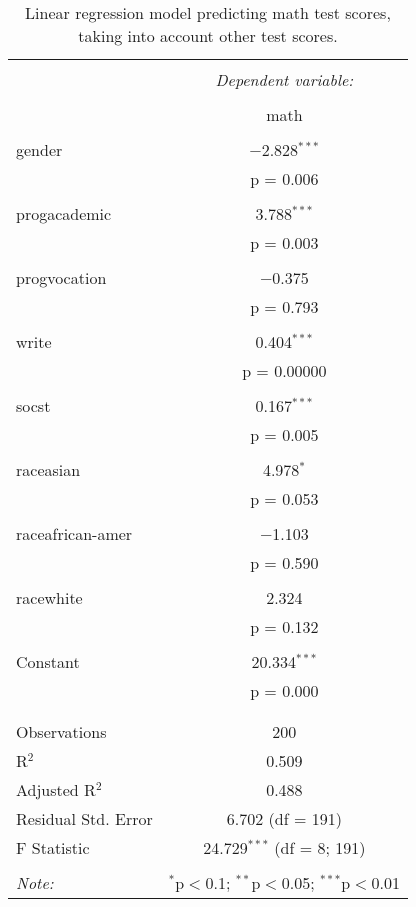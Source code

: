 
\begin{table}[!htbp] \centering 
  \caption{Linear regression model predicting math test scores, taking into 
          account other test scores.} 
  \label{tab::lm_math_peeking} 
\begin{tabular}{@{\extracolsep{5pt}}lc} 
\\[-1.8ex]\hline 
\hline \\[-1.8ex] 
 & \multicolumn{1}{c}{\textit{Dependent variable:}} \\ 
\cline{2-2} 
\\[-1.8ex] & math \\ 
\hline \\[-1.8ex] 
 gender & $-$2.828$^{***}$ \\ 
  & p = 0.006 \\ 
  & \\ 
 progacademic & 3.788$^{***}$ \\ 
  & p = 0.003 \\ 
  & \\ 
 progvocation & $-$0.375 \\ 
  & p = 0.793 \\ 
  & \\ 
 write & 0.404$^{***}$ \\ 
  & p = 0.00000 \\ 
  & \\ 
 socst & 0.167$^{***}$ \\ 
  & p = 0.005 \\ 
  & \\ 
 raceasian & 4.978$^{*}$ \\ 
  & p = 0.053 \\ 
  & \\ 
 raceafrican-amer & $-$1.103 \\ 
  & p = 0.590 \\ 
  & \\ 
 racewhite & 2.324 \\ 
  & p = 0.132 \\ 
  & \\ 
 Constant & 20.334$^{***}$ \\ 
  & p = 0.000 \\ 
  & \\ 
\hline \\[-1.8ex] 
Observations & 200 \\ 
R$^{2}$ & 0.509 \\ 
Adjusted R$^{2}$ & 0.488 \\ 
Residual Std. Error & 6.702 (df = 191) \\ 
F Statistic & 24.729$^{***}$ (df = 8; 191) \\ 
\hline 
\hline \\[-1.8ex] 
\textit{Note:}  & \multicolumn{1}{r}{$^{*}$p$<$0.1; $^{**}$p$<$0.05; $^{***}$p$<$0.01} \\ 
\end{tabular} 
\end{table} 
